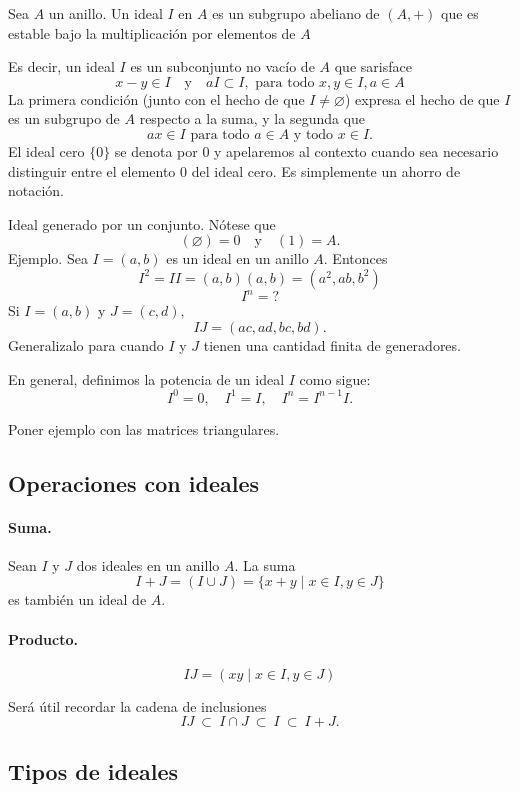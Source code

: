 \documentclass[b5paper,10pt]{book}
\begin{document}
\begin{defi}
Sea \(A\) un anillo.
Un ideal \(I\) en \(A\) es un subgrupo abeliano de \((A,+)\)
que es estable bajo la multiplicación por elementos de \(A\)
\end{defi}
Es decir, un ideal \(I\) es un subconjunto no vacío de \(A\) 
que sarisface
\[
x-y\in I\quad\text{y}\quad a I\subset I, \text{ para todo } x,y\in I, a \in A
\]
La primera condición (junto con el hecho de que \(I\neq \varnothing\))
expresa el hecho de que \(I\) es un subgrupo de \(A\) respecto a la suma,
y la segunda que 
\[
ax \in I \text{ para todo } a\in A \text{ y todo } x\in I.
\]
El ideal cero \(\{0\}\) se denota por \(0\)
y apelaremos al contexto cuando sea necesario
distinguir entre el elemento \(0\) del ideal cero.
Es simplemente un ahorro de notación.

Ideal generado por un conjunto.
Nótese que 
\[
(\varnothing) = 0\quad \text{y}\quad (1) = A.
\]
Ejemplo.
Sea \(I = (a,b)\) es un ideal en un anillo \(A\).
Entonces \[I^2 = II = (a,b)(a,b)= (a^2, ab, b^2)\]
\[
I^n = ? 
\]
Si \(I = (a,b)\) y \(J=(c,d)\),
\[
IJ = (ac,ad,bc,bd).
\]
Generalizalo para cuando \(I\) y \(J\) 
tienen una cantidad finita de generadores.

En general, definimos la potencia de un ideal \(I\) como sigue:
\[
I^0 = 0,\quad I^1 = I, \quad I^n = I^{n-1}I.
\]

Poner ejemplo con las matrices triangulares.

\subsection{Operaciones con ideales}

\paragraph{Suma.}%
Sean \(I\) y \(J\) dos ideales en un anillo \(A\).
La suma 
\[
I+J = \left(I\cup J\right)= \{x+y \mid x\in I, y\in J\}
\]
es también un ideal de \(A\).

\paragraph{Producto.}%
\[
IJ = \left(xy\mid x\in I, y\in J\right)
\]


Será útil recordar la cadena de inclusiones
\[
IJ\ \subset\ I\cap J\ \subset\ I\ \subset\ I+J.
\]

\subsection{Tipos de ideales}
\end{document}
